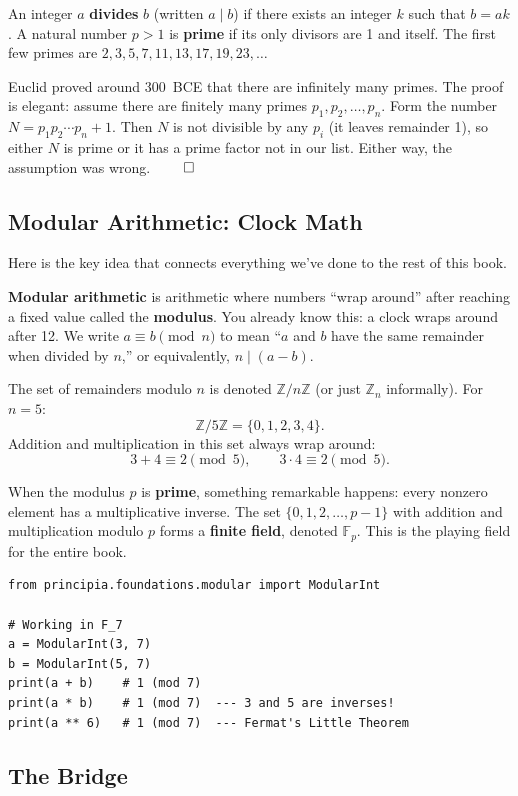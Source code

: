 An integer $a$ \textbf{divides} $b$ (written $a \mid b$) if there exists an
integer $k$ such that $b = ak$. A natural number $p > 1$ is \textbf{prime}
if its only divisors are 1 and itself. The first few primes are $2, 3, 5, 7,
11, 13, 17, 19, 23, \ldots$

Euclid proved around 300~BCE that there are infinitely many primes. The proof
is elegant: assume there are finitely many primes $p_1, p_2, \ldots, p_n$.
Form the number $N = p_1 p_2 \cdots p_n + 1$. Then $N$ is not divisible by
any $p_i$ (it leaves remainder 1), so either $N$ is prime or it has a prime
factor not in our list. Either way, the assumption was wrong. $\qed$

\subsection{Modular Arithmetic: Clock Math}

Here is the key idea that connects everything we've done to the rest of this
book.

\textbf{Modular arithmetic} is arithmetic where numbers ``wrap around'' after
reaching a fixed value called the \textbf{modulus}. You already know this: a
clock wraps around after 12. We write $a \equiv b \pmod{n}$ to mean ``$a$ and
$b$ have the same remainder when divided by $n$,'' or equivalently, $n \mid
(a - b)$.

The set of remainders modulo $n$ is denoted $\mathbb{Z}/n\mathbb{Z}$ (or just
$\mathbb{Z}_n$ informally). For $n = 5$:
\[
    \mathbb{Z}/5\mathbb{Z} = \{0, 1, 2, 3, 4\}.
\]
Addition and multiplication in this set always wrap around:
\[
    3 + 4 \equiv 2 \pmod{5}, \qquad 3 \cdot 4 \equiv 2 \pmod{5}.
\]

When the modulus $p$ is \textbf{prime}, something remarkable happens: every
nonzero element has a multiplicative inverse. The set $\{0, 1, 2, \ldots,
p-1\}$ with addition and multiplication modulo $p$ forms a \textbf{finite
field}, denoted $\mathbb{F}_p$. This is the playing field for the entire book.

\begin{verbatim}
from principia.foundations.modular import ModularInt

# Working in F_7
a = ModularInt(3, 7)
b = ModularInt(5, 7)
print(a + b)    # 1 (mod 7)
print(a * b)    # 1 (mod 7)  --- 3 and 5 are inverses!
print(a ** 6)   # 1 (mod 7)  --- Fermat's Little Theorem
\end{verbatim}

\subsection{The Bridge}

